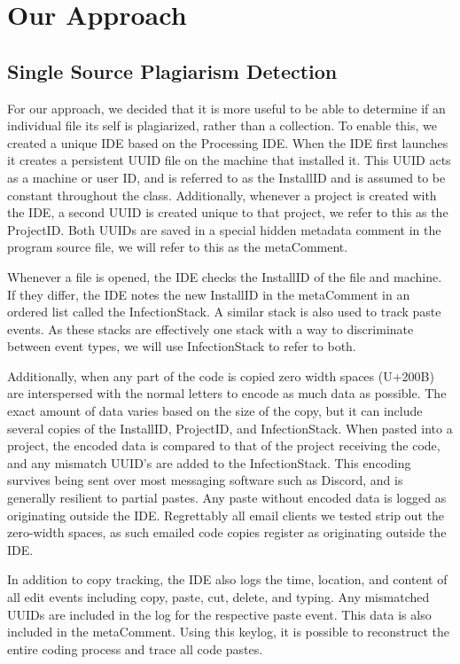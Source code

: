 \documentclass[letterpaper,10pt,conference]{IEEEtran}
\newcommand{\installID}{InstallID\xspace}
\newcommand{\projectID}{ProjectID\xspace}
\newcommand{\metaComment}{metaComment\xspace}
\newcommand{\infectionStack}{InfectionStack\xspace}
\begin{document}
\section{Our Approach} 
\subsection{Single Source Plagiarism Detection}
For our approach, we decided that it is more useful to be able to determine if an individual file its self is plagiarized, rather than a collection.  To enable this, we created a unique IDE based on the Processing IDE.  When the IDE first launches it creates a persistent UUID file on the machine that installed it.  This UUID acts as a machine or user ID, and is referred to as the \installID and is assumed to be constant throughout the class.  Additionally, whenever a project is created with the IDE, a second UUID is created unique to that project, we refer to this as the \projectID.  Both UUIDs are saved in a special hidden metadata comment in the program source file, we will refer to this as the \metaComment.

Whenever a file is opened, the IDE checks the \installID of the file and machine.  If they differ, the IDE notes the new \installID in the \metaComment in an ordered list called the \infectionStack.  A similar stack is also used to track paste events.  As these stacks are effectively one stack with a way to discriminate between event types, we will use \infectionStack to refer to both.

Additionally, when any part of the code is copied zero width spaces (U+200B) are interspersed with the normal letters to encode as much data as possible.  The exact amount of data varies based on the size of the copy, but it can include several copies of the \installID, \projectID, and \infectionStack.  When pasted into a project, the encoded data is compared to that of the project receiving the code, and any mismatch UUID's are added to the \infectionStack. This encoding survives being sent over most messaging software such as Discord, and is generally resilient to partial pastes.  Any paste without encoded data is logged as originating outside the IDE.   Regrettably all email clients we tested strip out the zero-width spaces, as such emailed code copies register as originating outside the IDE. 

In addition to copy tracking, the IDE also logs the time, location, and content of all edit events including copy, paste, cut, delete, and typing.  Any mismatched UUIDs are included in the log for the respective paste event.  This data is also included in the \metaComment.  Using this keylog, it is possible to reconstruct the entire coding process and trace all code pastes.
\end{document}
